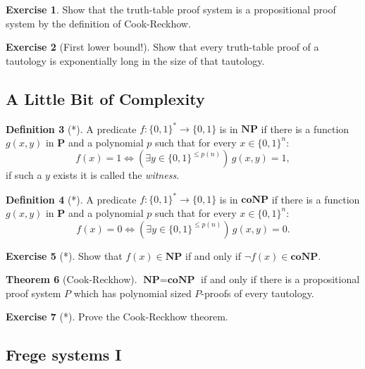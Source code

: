 \documentclass{article}
\theoremstyle{definition}
\newtheorem{thrm}{Theorem}
\newtheorem{excs}[thrm]{Exercise}
\newtheorem{defi}[thrm]{Definition}
\renewcommand{\P}{\textbf{P}}
\newcommand{\NP}{\textbf{NP}}
\newcommand{\coNP}{\textbf{coNP}}
\begin{document}
\begin{excs}
    Show that the truth-table proof system is a propositional proof system by the definition of Cook-Reckhow.
\end{excs}

\begin{excs}[First lower bound!]
    Show that every truth-table proof of a tautology is exponentially long in the size of that tautology.
\end{excs}


\subsection*{A Little Bit of Complexity}

\begin{defi}[*]
    A predicate $f: \{0,1\}^* \to \{0,1\}$ is in $\NP$ if there is a function $g(x,y)$ in $\P$ and a polynomial $p$ such that for every $x\in \{0,1\}^n$:
    \[ f(x)=1 \iff (\exists y\in\{0,1\}^{\leq p(n)}) \, g(x,y)=1, \]
    if such a $y$ exists it is called the \emph{witness}.
\end{defi}

\begin{defi}[*]
    A predicate $f: \{0,1\}^* \to \{0,1\}$ is in $\coNP$ if there is a function $g(x,y)$ in $\P$ and a polynomial $p$ such that for every $x\in \{0,1\}^n$:
    \[ f(x)=0 \iff (\exists y\in\{0,1\}^{\leq p(n)}) \, g(x,y)=0.\]
\end{defi}


\begin{excs}[*]
    Show that $f(x)\in \NP$ if and only if $\lnot f(x) \in \coNP$. 
\end{excs}

\begin{thrm}[Cook-Reckhow]
    $\NP=\coNP$ if and only if there is a propositional proof system $P$ which has polynomial sized $P$-proofs of every tautology.
\end{thrm}

\begin{excs}[*]
    Prove the Cook-Reckhow theorem.
\end{excs}

\subsection*{Frege systems I}
\end{document}
